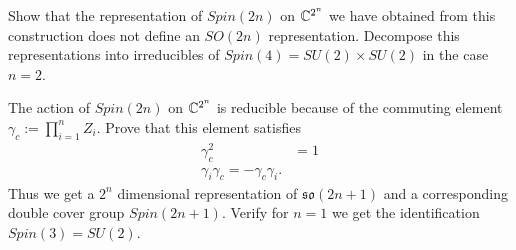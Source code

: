\documentclass{article}
\begin{document}
\bigskip
\begin{prob}
    Show that the representation of $Spin(2n)$ on $\mathbb{C}^{2^n}$ we have obtained from this construction does not define an $SO(2n)$ representation. Decompose this representations into irreducibles of $Spin(4) = SU(2) \times SU(2)$ in the case $n=2$.
\end{prob}

\bigskip
\begin{prob}
    The action of $Spin(2n)$ on $\mathbb{C}^{2^n}$ is reducible because of the commuting element $\gamma_c := \prod_{i=1}^n Z_i$. Prove that this element satisfies
    \begin{align*}
        \gamma_c^2 &= 1 \\
        \gamma_i \gamma_c = -\gamma_c \gamma_i.
    \end{align*}
    Thus we get a $2^n$ dimensional representation of $\mathfrak{so}(2n+1)$ and a corresponding double cover group $Spin(2n+1)$. Verify for $n=1$ we get the identification $Spin(3)=SU(2)$.
    
\end{prob}
\end{document}
